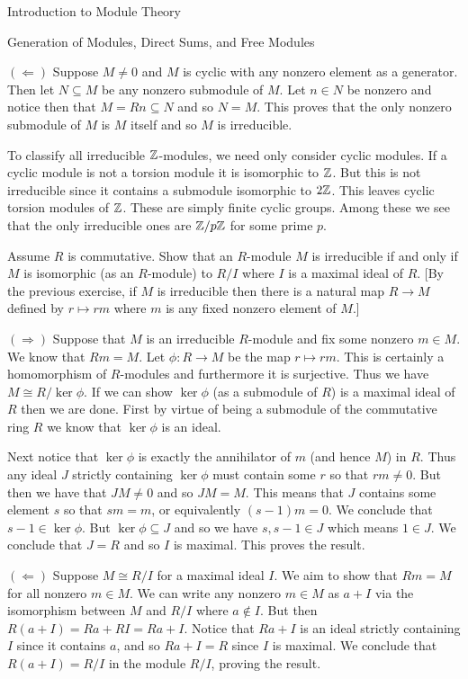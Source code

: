\begin{chapter}{Introduction to Module Theory}
\begin{section}{Generation of Modules, Direct Sums, and Free Modules}
\begin{solution}
$(\Leftarrow)$ Suppose $M\neq 0$ and $M$ is cyclic with any nonzero element as a generator. Then let $N\subseteq M$ be any nonzero submodule of $M$. Let $n\in N$ be nonzero and notice then that $M = Rn \subseteq N$ and so $N=M$. This proves that the only nonzero submodule of $M$ is $M$ itself and so $M$ is irreducible.

 To classify all irreducible $\mathbb{Z}$-modules,  we need only consider cyclic modules. If a cyclic module is not a torsion module it is isomorphic to $\mathbb{Z}$. But this is not irreducible since it contains a submodule isomorphic to $2\mathbb{Z}$. This leaves cyclic torsion modules of $\mathbb{Z}$. These are simply finite cyclic groups. Among these we see that the only irreducible ones are $\mathbb{Z}/p\mathbb{Z}$ for some prime $p$. 

\end{solution}\oneperpage



\begin{problem}\label{ex:10.3.10}
Assume $R$ is commutative. Show that an $R$-module $M$ is irreducible if and only if $M$ is isomorphic (as an $R$-module) to $R/I$ where $I$ is a maximal ideal of $R$. [By the previous exercise, if $M$ is irreducible then there is a natural map $R\to M$ defined by $r\mapsto rm$ where $m$ is any fixed nonzero element of $M$.]
\end{problem}
\begin{solution}
$(\Rightarrow)$ Suppose that $M$ is an irreducible $R$-module and fix some nonzero $m\in M$. We know that $Rm = M$. Let $\phi:R\to M$ be the map $r\mapsto rm$. This is certainly a homomorphism of $R$-modules and furthermore it is surjective. Thus we have $M \cong R/\ker \phi$. If we can show $ \ker\phi$ (as a submodule of $R$) is a maximal ideal of $R$ then we are done. First by virtue of being a submodule of the commutative ring $R$ we know that $\ker\phi$ is an ideal. 

 Next notice that $\ker\phi$ is exactly the annihilator of $m$ (and hence $M$) in $R$. Thus any ideal $J$ strictly containing $\ker\phi$ must contain some $r$ so that $rm\neq 0$. But then we have that $JM \neq 0$ and so $JM = M$. This means that $J$ contains some element $s$ so that $sm = m$, or equivalently $(s-1)m  = 0$. We conclude that $s-1\in \ker\phi$. But $\ker\phi\subseteq J$ and so we have $s,s-1\in J$ which means $1\in J$. We conclude that $J=R$ and so $I$ is maximal. This proves the result. 
 
 $(\Leftarrow)$ Suppose $M \cong R/I$ for a maximal ideal $I$. We aim to show that $Rm = M$ for all nonzero $m\in M$. We can write any nonzero $m\in M$ as $a+I$ via the isomorphism between $M$ and $R/I$ where $a\notin I$. But then $R(a+I) = Ra+RI = Ra+I$. Notice that $Ra+I$ is an ideal strictly containing $I$ since it contains $a$, and so $Ra+I = R$ since $I$ is maximal. We conclude that $R(a+I) = R/I$ in the module $R/I$, proving the result.
\end{solution}\oneperpage




\end{section}
\end{chapter}
